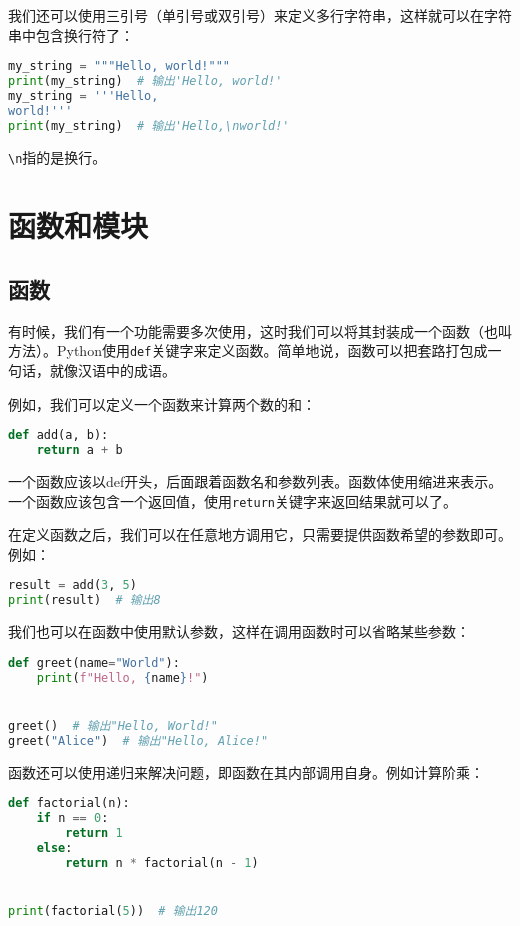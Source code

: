 \documentclass[../main.tex]{subfiles}
\begin{document}
我们还可以使用三引号（单引号或双引号）来定义多行字符串，这样就可以在字符串中包含换行符了：
\begin{lstlisting}[language=python]
my_string = """Hello, world!"""
print(my_string)  # 输出'Hello, world!'
my_string = '''Hello,
world!'''
print(my_string)  # 输出'Hello,\nworld!'
\end{lstlisting}

\texttt{\textbackslash n}指的是换行。

\section{函数和模块}\label{sec:functions-and-modules}

\subsection{函数}

有时候，我们有一个功能需要多次使用，这时我们可以将其封装成一个函数（也叫方法）。Python使用\texttt{def}关键字来定义函数。简单地说，函数可以把套路打包成一句话，就像汉语中的成语。

例如，我们可以定义一个函数来计算两个数的和：
\begin{lstlisting}[language=python]
def add(a, b):
    return a + b
\end{lstlisting}

一个函数应该以def开头，后面跟着函数名和参数列表。函数体使用缩进来表示。一个函数应该包含一个返回值，使用\texttt{return}关键字来返回结果就可以了。

在定义函数之后，我们可以在任意地方调用它，只需要提供函数希望的参数即可。例如：
\begin{lstlisting}[language=python]
result = add(3, 5)
print(result)  # 输出8  
\end{lstlisting}

我们也可以在函数中使用默认参数，这样在调用函数时可以省略某些参数：
\begin{lstlisting}[language=python]
def greet(name="World"):
    print(f"Hello, {name}!")


greet()  # 输出"Hello, World!"
greet("Alice")  # 输出"Hello, Alice!"
\end{lstlisting}

函数还可以使用递归来解决问题，即函数在其内部调用自身。例如计算阶乘：
\begin{lstlisting}[language=python]
def factorial(n):
    if n == 0:
        return 1
    else:
        return n * factorial(n - 1)


print(factorial(5))  # 输出120
\end{lstlisting}
\end{document}
